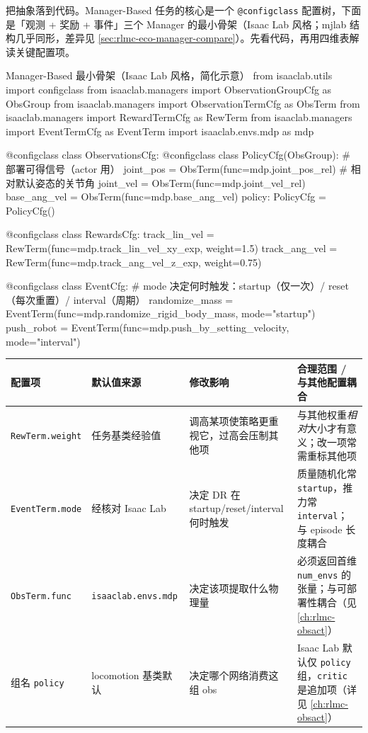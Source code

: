 把抽象落到代码。Manager-Based 任务的核心是一个 \verb|@configclass| 配置树，下面是「观测 + 奖励 + 事件」三个 Manager 的最小骨架（Isaac Lab 风格；mjlab 结构几乎同形，差异见 \cref{sec:rlmc-eco-manager-compare}）。先看代码，再用四维表解读关键配置项。

\begin{codebox}[Python]{Manager-Based 最小骨架（Isaac Lab 风格，简化示意）}
from isaaclab.utils import configclass
from isaaclab.managers import ObservationGroupCfg as ObsGroup
from isaaclab.managers import ObservationTermCfg as ObsTerm
from isaaclab.managers import RewardTermCfg as RewTerm
from isaaclab.managers import EventTermCfg as EventTerm
import isaaclab.envs.mdp as mdp

@configclass
class ObservationsCfg:
    @configclass
    class PolicyCfg(ObsGroup):                       # 部署可得信号（actor 用）
        joint_pos = ObsTerm(func=mdp.joint_pos_rel)  # 相对默认姿态的关节角
        joint_vel = ObsTerm(func=mdp.joint_vel_rel)
        base_ang_vel = ObsTerm(func=mdp.base_ang_vel)
    policy: PolicyCfg = PolicyCfg()

@configclass
class RewardsCfg:
    track_lin_vel = RewTerm(func=mdp.track_lin_vel_xy_exp, weight=1.5)
    track_ang_vel = RewTerm(func=mdp.track_ang_vel_z_exp, weight=0.75)

@configclass
class EventCfg:
    # mode 决定何时触发：startup（仅一次）/ reset（每次重置）/ interval（周期）
    randomize_mass = EventTerm(func=mdp.randomize_rigid_body_mass, mode="startup")
    push_robot = EventTerm(func=mdp.push_by_setting_velocity, mode="interval")
\end{codebox}

\begin{center}
\small
\begin{tabular}{@{}lp{2.6cm}p{3.0cm}p{3.4cm}@{}}
\toprule
配置项 & 默认值来源 & 修改影响 & 合理范围 / 与其他配置耦合 \\
\midrule
\verb|RewTerm.weight| & 任务基类经验值\,\cite{rudin2021minutes} & 调高某项使策略更重视它，过高会压制其他项 & 与其他权重\emph{相对}大小才有意义；改一项常需重标其他项 \\
\verb|EventTerm.mode| & 经核对 Isaac Lab\,\cite{mittal2025isaaclab} & 决定 DR 在 startup/reset/interval 何时触发 & 质量随机化常 \verb|startup|，推力常 \verb|interval|；与 episode 长度耦合 \\
\verb|ObsTerm.func| & \verb|isaaclab.envs.mdp|\,\cite{mittal2025isaaclab} & 决定该项提取什么物理量 & 必须返回首维 \verb|num_envs| 的张量；与可部署性耦合（见 \cref{ch:rlmc-obsact}） \\
组名 \verb|policy| & locomotion 基类默认 & 决定哪个网络消费这组 obs & Isaac Lab 默认仅 \verb|policy| 组，\verb|critic| 是追加项（详见 \cref{ch:rlmc-obsact}） \\
\bottomrule
\end{tabular}
\end{center}

